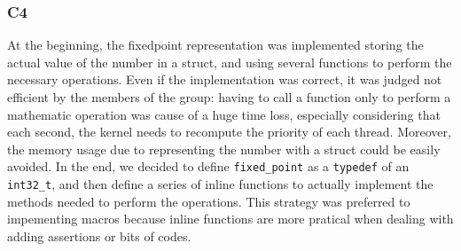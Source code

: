 \documentclass[a4wide, 11pt]{article}
\newcommand{\tx}{\texttt}
\begin{document}
\subsubsection{C4}
At the beginning, the fixed\-point representation was implemented storing the actual value of the number in a struct, and using several functions to perform the necessary operations. Even if the implementation was correct, it was judged not efficient by the members of the group: having to call a function only to perform a mathematic operation was cause of a huge time loss, especially considering that each second, the kernel needs to recompute the priority of each thread. Moreover, the memory usage due to representing the number with a struct could be easily avoided. In the end, we decided to define \tx{fixed\_point} as a \tx{typedef} of an \tx{int32\_t}, and then define a series of inline functions to actually implement the methods needed to perform the operations. This strategy was preferred to impementing macros because inline functions are more pratical when dealing with adding assertions or bits of codes.
\end{document}
